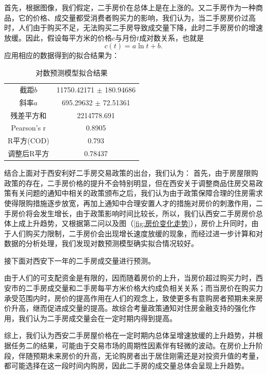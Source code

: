 \documentclass[withoutpreface,bwprint]{cumcmthesis} %
\begin{document}
首先，根据图像，我们假定，二手房价在总体上是在上涨的。又二手房作为一种商品，它的价格、成交量都受消费者购买力的影响，我们认为，当二手房房价过高时，人们由于购买不足，无法购买二手房导致成交量下降，此时二手房房价的增速放缓。因此，假设每平方米的价格$c$与月份$t$成对数关系，也就是
\begin{equation}
    c(t)=a\ln t+b.
\end{equation}
应用相应的数据得到的拟合结果为：
\begin{table}[H]
  \centering
    \begin{tabular}{cc}
    \toprule
    截距$b$    & 11750.42171 $\pm $ 180.94686 \\
    斜率$a$    & 695.29632 $\pm$ 72.51361 \\
    残差平方和 & 2214778.691 \\
    Pearson's r & 0.8905 \\
    R平方(COD) & 0.793 \\
    调整后R平方 & 0.78437 \\
    \bottomrule
    \end{tabular}%
    \caption{对数预测模型拟合结果}
\end{table}%

结合上面对于西安利好二手房交易政策的出台，我们认为：
首先，由于房屋限购政策的存在，二手房价格的提升不会特别明显，但在西安关于调整商品住房交易政策有关问题的通知中相关的政策颁布之后，我们认为由于政策保障合理的住房需求使得限购措施逐步放宽，再加上通知中合理安置人才的措施对房价的刺激作用，二手房价将会发生增长\cite{RN3}，由于政策影响时间比较长，所以，我们认西安二手房房价总体上成上升趋势，又根据第二问以及图（\ref{fig:房价变化走势}），房价上升同时，由于人们购买力限制，二手房价会出现增长速度放缓的现象，而经过进一步计算和对数据的分析处理，我们发现对数预测模型确实拟合情况较好。

接下面对西安下一年的二手房成交量进行预测。

由于人们的可支配资金是有限的，因而随着房价的上升，当房价超过购买力时，西安市的二手房成交量和二手房每平方米价格大约成负相关关系\cite{RN6}；而当房价在购买力承受范围内时，房价的提高作用在人们的观念上，致使更多有意购房者预期未来房价升高，继而促进成交量的提高。故综合考量政策通知对住房金融支持的强化作用，我们认为二手房成交量会在一定时期内得到提高。

综上，我们认为西安二手房屋价格在一定时期内总体呈增速放缓的上升趋势，并根据任务二的结果，可能由于交易市场的周期性因素伴有轻微的波动。在房价上升阶段，伴随预期未来房价的升高，无论购房者出于居住刚需还是对投资升值的考量，都可能选择在这一段时间内购房，因此二手房的成交量总体会呈现上升趋势。
\end{document}

